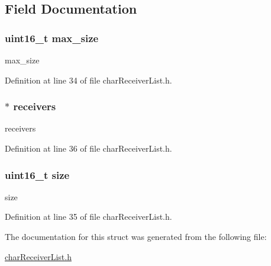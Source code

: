 \subsection{Field Documentation}
\hypertarget{structchar_receiver_list__t_a58516967d6d94fcbcd0b8fc2320e581f}{}
\subsubsection[{max\+\_\+size}]{\setlength{\rightskip}{0pt plus 5cm}uint16\+\_\+t max\+\_\+size}\label{structchar_receiver_list__t_a58516967d6d94fcbcd0b8fc2320e581f}


max\+\_\+size 



Definition at line 34 of file char\+Receiver\+List.\+h.

\hypertarget{structchar_receiver_list__t_a11b30fbbfca635c2ca5a60a7ef8e7a58}{}
\subsubsection[{receivers}]{$\ast$ receivers}\label{structchar_receiver_list__t_a11b30fbbfca635c2ca5a60a7ef8e7a58}


receivers 



Definition at line 36 of file char\+Receiver\+List.\+h.

\hypertarget{structchar_receiver_list__t_aaba88b24a21a6c70c895c0d55f4a69a0}{}
\subsubsection[{size}]{\setlength{\rightskip}{0pt plus 5cm}uint16\+\_\+t size}\label{structchar_receiver_list__t_aaba88b24a21a6c70c895c0d55f4a69a0}


size 



Definition at line 35 of file char\+Receiver\+List.\+h.



The documentation for this struct was generated from the following file\+:\begin{DoxyCompactItemize}
\item 
\hyperlink{char_receiver_list_8h}{char\+Receiver\+List.\+h}\end{DoxyCompactItemize}
